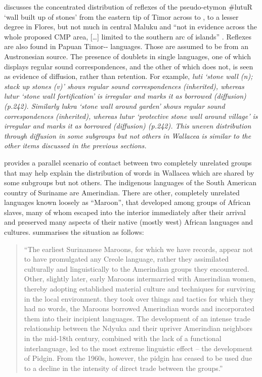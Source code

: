 \citet{Schapper2020a} discusses the concentrated distribution
of reflexes of the pseudo-etymon {\#}lutuR ‘wall built up of
stones’ from the eastern tip of Timor across to ,
to a lesser degree in Flores,
but not much in central Maluku
and “not in evidence across the whole proposed CMP area,
[{\ldots}] limited to the southern arc of islands” \citep[241]{Schapper2020a}.
Reflexes are also found in Papuan Timor-- languages.
Those are assumed to be from an Austronesian source.
The presence of doublets in single languages,
one of which displays regular sound correspondences,
and the other of which does not,
is seen as evidence of diffusion, rather than retention.
For example,  \it{luti} ‘stone wall (n); stack up stones
(v)’ shows regular sound correspondences (inherited),
whereas  \it{lutur} ‘stone wall fortification’ is irregular
and marks it as borrowed (diffusion) (p.242).
Similarly   \it{lukra} ‘stone wall around garden’
shows regular sound correspondences (inherited),
whereas   \it{lutur} ‘protective stone wall around
village’ is irregular and marks it as borrowed (diffusion) (p.242).
This uneven distribution through diffusion in some subgroups
but not others in Wallacea is similar to the other items discussed
in the previous sections.

\citet{Borges2014} provides a parallel scenario of contact between
two completely unrelated groups that may help explain the distribution
of words in Wallacea which are shared by some subgroups but not others.
The indigenous languages of the South American country of Suriname are Amerindian.
There are other, completely unrelated languages known loosely
as ``Maroon'', that developed among groups of African slaves,
many of whom escaped into the interior immediately after their
arrival and preserved many aspects of their native (mostly west) African languages and cultures.
\citet[99]{Borges2014} summarises the situation as follows:

\begin{quote}
	“The earliest Surinamese Maroons,
	for which we have records,
	appear not to have promulgated any Creole language,
	rather they assimilated culturally
	and linguistically to the Amerindian groups they encountered.
	Other, slightly later, early Maroons intermarried with Amerindian
	women, thereby adopting established material culture
	and techniques for surviving in the local environment.
	 they took over things
	and tactics for which they had no words,
	the Maroons borrowed Amerindian words
	and incorporated them into their incipient languages.
	The development of an intense trade relationship between the
	Ndyuka and their upriver Amerindian neighbors in the mid-18th century,
	combined with the lack of a functional interlanguage,
	led to the most extreme linguistic effect -- the development of  Pidgin.
	From the 1960s, however,
	the pidgin has ceased to be used due to a decline in the intensity
	of direct trade between the groups.” \citep[99]{Borges2014}
\end{quote}

